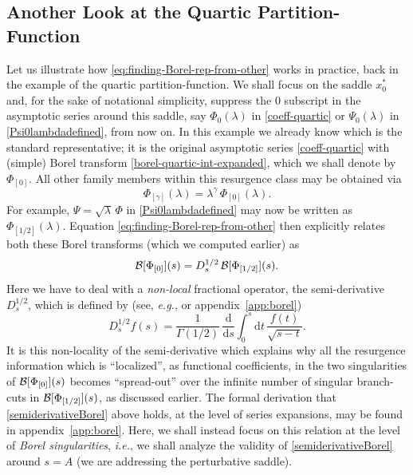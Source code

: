 \documentclass[11pt,a4paper]{article}
\newcommand{\CB}{{\cal B}}
\newcommand{\be}{\begin{equation}}
\newcommand{\ee}{\end{equation}}
\newcommand{\rmd}{{\mathrm{d}}}
\begin{document}
\subsection*{Another Look at the Quartic Partition-Function}

Let us illustrate how \eqref{eq:finding-Borel-rep-from-other} works in practice, back in the example of the quartic partition-function. We shall focus on the saddle $x^*_0$ and, for the sake of notational simplicity, suppress the $0$ subscript in the asymptotic series around this saddle, say $\Phi_0 (\lambda)$ in \eqref{coeff-quartic} or $\Psi_0 (\lambda)$ in \eqref{Psi0lambdadefined}, from now on. In this example we already know which is the standard representative; it is the original asymptotic series \eqref{coeff-quartic} with (simple) Borel transform \eqref{borel-quartic-int-expanded}, which we shall denote by $\Phi_{[0]}$. All other family members within this resurgence class may be obtained via
%
\be
\Phi_{[\gamma]} (\lambda) = \lambda^\gamma\, \Phi_{[0]} (\lambda).
\ee
%
\noindent
For example, $\Psi = \sqrt{\lambda}\, \Phi$ in \eqref{Psi0lambdadefined} may now be written as $\Phi_{[1/2]} (\lambda)$. Equation \eqref{eq:finding-Borel-rep-from-other} then explicitly relates both these Borel transforms (which we computed earlier) as
%
\be
\label{semiderivativeBorel}
\CB [\Phi_{[0]}] (s) = D_s^{1/2}\, \CB [\Phi_{[1/2]}] (s).
\ee
%
\noindent
Here we have to deal with a \textit{non-local} fractional operator, the semi-derivative $D_s^{1/2}$, which is defined by (see, \textit{e.g.}, \cite{lot76} or appendix~\ref{app:borel})
%
\be
D_s^{1/2} f(s) = \frac{1}{\Gamma \left(1/2\right)}\, \frac{\rmd}{\rmd s} \int_0^s \rmd t\, \frac{f(t)}{\sqrt{s-t}}.
\ee
%
\noindent
It is this non-locality of the semi-derivative which explains why all the resurgence information which is ``localized'', as functional coefficients, in the two singularities of $\CB [\Phi_{[0]}] (s)$ becomes ``spread-out'' over the infinite number of singular branch-cuts in $\CB [\Phi_{[1/2]}] (s)$, as discussed earlier. The formal derivation that \eqref{semiderivativeBorel} above holds, at the level of series expansions, may be found in appendix~\ref{app:borel}. Here, we shall instead focus on this relation at the level of \textit{Borel singularities}, \textit{i.e.}, we shall analyze the validity of \eqref{semiderivativeBorel} around $s=A$ (we are addressing the perturbative saddle).
\end{document}
